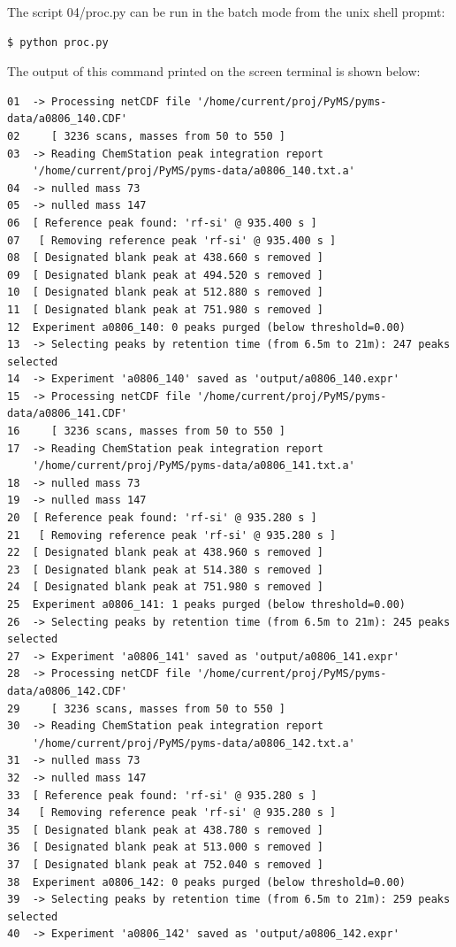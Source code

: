 The script 04/proc.py can be run in the batch mode from the unix shell
propmt:

\begin{verbatim}
$ python proc.py
\end{verbatim}

\noindent
The output of this command printed on the screen terminal is shown below:

\begin{verbatim}
01  -> Processing netCDF file '/home/current/proj/PyMS/pyms-data/a0806_140.CDF'
02     [ 3236 scans, masses from 50 to 550 ]
03  -> Reading ChemStation peak integration report
    '/home/current/proj/PyMS/pyms-data/a0806_140.txt.a'
04  -> nulled mass 73
05  -> nulled mass 147
06  [ Reference peak found: 'rf-si' @ 935.400 s ]
07   [ Removing reference peak 'rf-si' @ 935.400 s ]
08 	[ Designated blank peak at 438.660 s removed ]
09 	[ Designated blank peak at 494.520 s removed ]
10 	[ Designated blank peak at 512.880 s removed ]
11 	[ Designated blank peak at 751.980 s removed ]
12  Experiment a0806_140: 0 peaks purged (below threshold=0.00)
13  -> Selecting peaks by retention time (from 6.5m to 21m): 247 peaks selected
14  -> Experiment 'a0806_140' saved as 'output/a0806_140.expr'
15  -> Processing netCDF file '/home/current/proj/PyMS/pyms-data/a0806_141.CDF'
16     [ 3236 scans, masses from 50 to 550 ]
17  -> Reading ChemStation peak integration report
    '/home/current/proj/PyMS/pyms-data/a0806_141.txt.a'
18  -> nulled mass 73
19  -> nulled mass 147
20  [ Reference peak found: 'rf-si' @ 935.280 s ]
21   [ Removing reference peak 'rf-si' @ 935.280 s ]
22 	[ Designated blank peak at 438.960 s removed ]
23 	[ Designated blank peak at 514.380 s removed ]
24 	[ Designated blank peak at 751.980 s removed ]
25  Experiment a0806_141: 1 peaks purged (below threshold=0.00)
26  -> Selecting peaks by retention time (from 6.5m to 21m): 245 peaks selected
27  -> Experiment 'a0806_141' saved as 'output/a0806_141.expr'
28  -> Processing netCDF file '/home/current/proj/PyMS/pyms-data/a0806_142.CDF'
29     [ 3236 scans, masses from 50 to 550 ]
30  -> Reading ChemStation peak integration report
    '/home/current/proj/PyMS/pyms-data/a0806_142.txt.a'
31  -> nulled mass 73
32  -> nulled mass 147
33  [ Reference peak found: 'rf-si' @ 935.280 s ]
34   [ Removing reference peak 'rf-si' @ 935.280 s ]
35 	[ Designated blank peak at 438.780 s removed ]
36 	[ Designated blank peak at 513.000 s removed ]
37 	[ Designated blank peak at 752.040 s removed ]
38  Experiment a0806_142: 0 peaks purged (below threshold=0.00)
39  -> Selecting peaks by retention time (from 6.5m to 21m): 259 peaks selected
40  -> Experiment 'a0806_142' saved as 'output/a0806_142.expr'
\end{verbatim}

